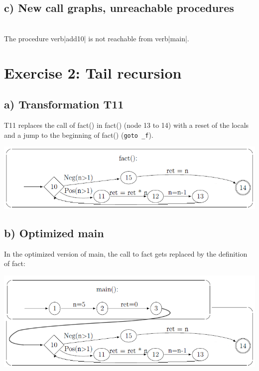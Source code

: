 \documentclass[11pt,a4paper]{scrartcl}
\begin{document}
\subsection*{c) New call graphs, unreachable procedures}
\\
The procedure verb|add10| is not reachable from verb|main|.


\section*{Exercise 2: Tail recursion}
\subsection*{a) Transformation T11}
T11 replaces the call of fact() in fact() (node 13 to 14) with a reset of the locals and a jump to the beginning of fact() (\verb|goto _f|).

\includegraphics[scale=.5]{2_1}

\subsection*{b) Optimized main}
In the optimized version of main, the call to fact gets replaced by the definition of fact:

\includegraphics[scale=.5]{2_2}
\end{document}
